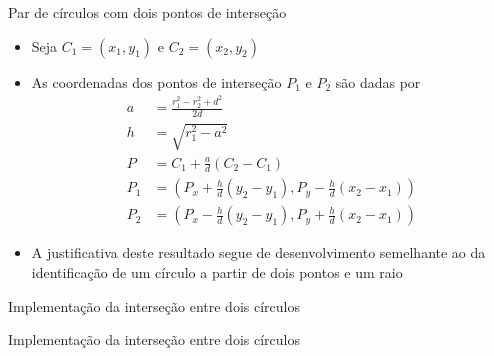 \begin{frame}[fragile]{Par de círculos com dois pontos de interseção}

    \begin{itemize}
        \item Seja $C_1 = (x_1, y_1)$ e $C_2 = (x_2, y_2)$
        \pause

        \item As coordenadas dos pontos de interseção $P_1$ e $P_2$ são dadas por
        \begin{align*}
            a &= \frac{r_1^2 - r_2^2 + d^2}{2d}\\
            h &= \sqrt{r_1^2 - a^2} \\
            P &= C_1 + \frac{a}{d}(C_2 - C_1) \\
            P_1 &= \left(P_x + \frac{h}{d}(y_2 - y_1), P_y - \frac{h}{d}(x_2 - x_1)\right) \\
            P_2 &= \left(P_x - \frac{h}{d}(y_2 - y_1), P_y + \frac{h}{d}(x_2 - x_1)\right)
        \end{align*}
        \pause

        \item A justificativa deste resultado segue de desenvolvimento semelhante ao da 
            identificação de um círculo a partir de dois pontos e um raio
        
    \end{itemize}

\end{frame}

\begin{frame}[fragile]{Implementação da interseção entre dois círculos}
\end{frame}

\begin{frame}[fragile]{Implementação da interseção entre dois círculos}
\end{frame}
